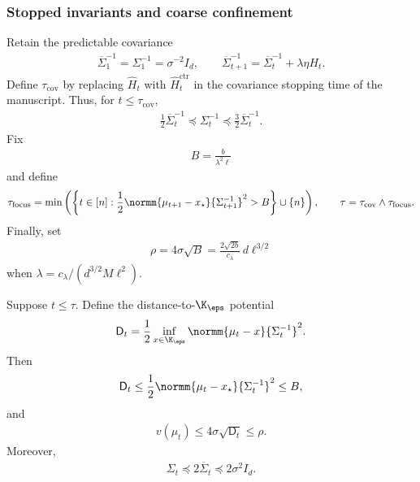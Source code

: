 \subsubsection{Stopped invariants and coarse confinement}

Retain the predictable covariance
\begin{align}
    \overline\Sigma_1^{-1}=\Sigma_1^{-1}=\sigma^{-2}I_d,
    \qquad
    \overline\Sigma_{t+1}^{-1}
    =\overline\Sigma_t^{-1}+\lambda\eta H_t.
    \label{eq:ctr-predictable-covariance}
\end{align}
Define $\tau_{\mathrm{cov}}$ by replacing $\widehat H_t$ with
$\widehat H_t^{\mathrm{ctr}}$ in the covariance stopping time of the
manuscript.  Thus, for $t\leq\tau_{\mathrm{cov}}$,
\begin{align}
    \frac12\overline\Sigma_t^{-1}
    \preceq\Sigma_t^{-1}
    \preceq\frac32\overline\Sigma_t^{-1}.
    \label{eq:ctr-cov-comparison}
\end{align}
Fix
\begin{align}
    B=\frac{b}{\lambda^2\ell}
    \label{eq:ctr-focus-radius}
\end{align}
and define
\begin{align}
    \tau_{\mathrm{focus}}
    =\min\left(
    \left\{
    t\in[n]:
    \frac12
    \normm{\mu_{t+1}-x_\star}{\Sigma_{t+1}^{-1}}^2>B
    \right\}\cup\{n\}
    \right),
    \qquad
    \tau=\tau_{\mathrm{cov}}\wedge\tau_{\mathrm{focus}}.
    \label{eq:ctr-safe-stop}
\end{align}
Finally, set
\begin{align}
    \rho=4\sigma\sqrt B
    =\frac{2\sqrt{2b}}{c_\lambda}\,d\ell^{3/2}
    \label{eq:ctr-rho}
\end{align}
when $\lambda=c_\lambda/(d^{3/2}M\ell^2)$.

\begin{lemma}
    \label{lem:ctr-coarse-confinement}
    Suppose $t\leq\tau$.  Define the distance-to-$\K_\eps$ potential
    \begin{align}
        \mathsf D_t
        =\frac12\inf_{x\in\K_\eps}
        \normm{\mu_t-x}{\Sigma_t^{-1}}^2.
        \label{eq:ctr-distance-potential}
    \end{align}
    Then
    \begin{align}
        \mathsf D_t
        \leq\frac12
        \normm{\mu_t-x_\star}{\Sigma_t^{-1}}^2
        \leq B,
        \label{eq:ctr-distance-below-focus}
    \end{align}
    and
    \begin{align}
        v(\mu_t)\leq4\sigma\sqrt{\mathsf D_t}
        \leq\rho.
        \label{eq:ctr-coarse-v-bound}
    \end{align}
    Moreover,
    \begin{align}
        \Sigma_t\preceq2\overline\Sigma_t
        \preceq2\sigma^2I_d.
        \label{eq:ctr-stopped-cov-upper}
    \end{align}
\end{lemma}

